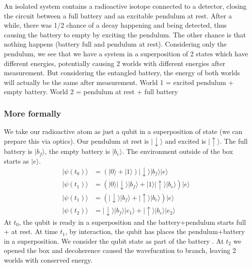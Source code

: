\documentclass{article}
\begin{document}
An isolated system contains a radioactive isotope connected to a detector, closing the circuit between a full battery and an excitable pendulum at rest. After a while, there was 1/2 chance of a decay happening and being detected, thus causing the battery to empty by exciting the pendulum. The other chance is that nothing happens (battery full and pendulum at rest). Considering only the pendulum, we see that we have a system in a superposition of 2 states which have different energies, potentially causing 2 worlds with different energies after measurement. But considering the entangled battery, the energy of both worlds will actually be the same after measurement. World 1 = excited pendulum + empty battery. World 2 = pendulum at rest + full battery 

\subsubsection{More formally}
We take our radioactive atom as just a qubit in a superposition of state (we can prepare this via optics). Our pendulum at rest is $|\downarrow\rangle$ and excited is $|\uparrow\rangle$. The full battery is $|b_f\rangle$, the empty battery is $|b_e\rangle$. The environment outside of the box starts as $|e\rangle$.
\begin{align}
    |\psi(t_0)\rangle&=(|0\rangle+|1\rangle)|\downarrow\rangle|b_f\rangle|e\rangle\\
    |\psi(t_1)\rangle&=(|0\rangle|\downarrow\rangle|b_f\rangle+|1\rangle|\uparrow\rangle|b_e\rangle)|e\rangle\\
    |\psi(t_1)\rangle&=(|\downarrow\rangle|b_f\rangle+|\uparrow\rangle|b_e\rangle)|e\rangle\\
    |\psi(t_2)\rangle&=|\downarrow\rangle|b_f\rangle|e_1\rangle+|\uparrow\rangle|b_e\rangle|e_2\rangle
\end{align}
At $t_0$, the qubit is ready in a superposition and the battery+pendulum starts full + at rest. At time $t_1$, by interaction, the qubit has places the pendulum+battery in a superposition. We consider the qubit state as part of the battery . At $t_2$ we opened the box and decoherence caused the wavefucntion to branch, leaving 2 worlds with conserved energy.
\end{document}
